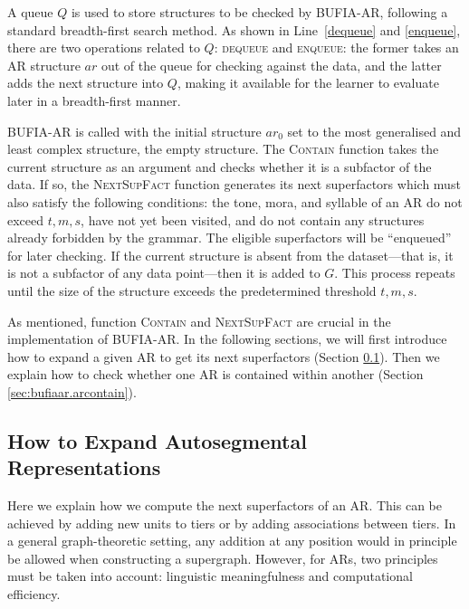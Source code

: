 A queue \(Q\) is used to store structures to be checked 
by BUFIA-AR, following a standard breadth-first search 
method. As shown in Line~\ref{dequeue} and \ref{enqueue},
there are two operations related to \(Q\): \textsc{dequeue} and
\textsc{enqueue}: the former takes an AR structure \(ar\) out of the queue
for checking against the data, and the latter adds the next structure
into \(Q\), making it available for the learner to evaluate later in a breadth-first
manner.

BUFIA-AR is called with the initial structure \( ar_0 \) set to the most
generalised and least complex structure, the empty structure. The
\textsc{Contain} function takes the current structure as an argument
and checks whether it is a subfactor of the data. If so, the
\textsc{NextSupFact} function generates its next superfactors
which must also satisfy the following conditions: the tone,
mora, and syllable of an AR do not exceed \(t, m, s\),
have not yet been visited, and do not contain any structures
already forbidden by the grammar. The eligible superfactors will be
``enqueued'' for later checking. If the current structure is
absent from the dataset---that is, it is not a
subfactor of any data point---then it is added to $G$. This process
repeats until the size of the structure exceeds the predetermined
threshold \(t, m, s\).

As mentioned, function \textsc{Contain} and \textsc{NextSupFact} are
crucial in the implementation of BUFIA-AR. In the following sections,
we will first introduce how to expand a given AR to get its next
superfactors (Section \ref{sec:bufiaar.nextar}). Then we explain how to check
whether one AR is contained within another (Section
\ref{sec:bufiaar.arcontain}).

\subsection{How to Expand Autosegmental Representations}
\label{sec:bufiaar.nextar}

Here we explain how we compute the next superfactors of an AR. This
can be achieved by adding new units to tiers or by adding associations
between tiers. In a general graph-theoretic setting, any addition at
any position would in principle be allowed when constructing a
supergraph. However, for ARs, two principles must be taken into
account: linguistic meaningfulness and computational efficiency.

